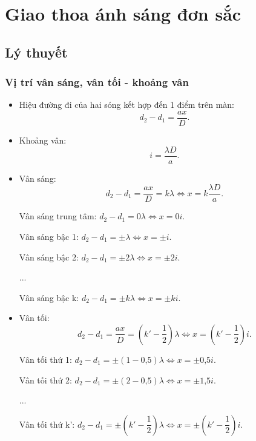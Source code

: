 
\chapter[Giao thoa ánh sáng đơn sắc]{Giao thoa ánh sáng đơn sắc}

\section{Lý thuyết}

\subsection{Vị trí vân sáng, vân tối - khoảng vân}


\begin{itemize}
	\item Hiệu đường đi của hai sóng kết hợp đến 1 điểm trên màn: 
	\begin{equation}
		d_2-d_1=\dfrac{ax}{D}.
	\end{equation}
	\item Khoảng vân: 
	\begin{equation}
		i=\dfrac{\lambda D}{a}.
	\end{equation}
	\item Vân sáng: 
	\begin{equation}
		d_2-d_1=\dfrac{ax}{D}=k\lambda \Leftrightarrow x=k\dfrac{\lambda D}{a}.
	\end{equation}
	
	Vân sáng trung tâm: $d_2 -d_1=0 \lambda \Leftrightarrow x= 0i$.
	
	Vân sáng bậc 1: $d_2 -d_1=\pm  \lambda \Leftrightarrow x= \pm i$.
	
	Vân sáng bậc 2: $d_2 -d_1=\pm  2\lambda \Leftrightarrow x= \pm 2i$.
	
	...
	
	Vân sáng bậc k: $d_2 -d_1=\pm  k\lambda \Leftrightarrow x= \pm ki$.
	
	\item Vân tối: 
	\begin{equation}
		d_2-d_1=\dfrac{ax}{D}=\left(k'-\dfrac{1}{2}\right) \lambda \Leftrightarrow x=\left(k'-\dfrac{1}{2}\right) i.
	\end{equation}
	
	Vân tối thứ 1: $d_2 -d_1=\pm (1-\text{0,5})  \lambda \Leftrightarrow x= \pm \text{0,5} i$.
	
	Vân tối thứ 2: $d_2 -d_1=\pm (2-\text{0,5})  \lambda \Leftrightarrow x= \pm \text{1,5} i$.
	
	...
	
	Vân tối thứ k': $d_2-d_1= \pm \left(k'-\dfrac{1}{2}\right) \lambda \Leftrightarrow  x=\pm\left(k'-\dfrac{1}{2}\right) i$.
\end{itemize}

